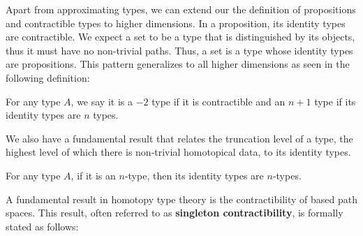 \documentclass[main.tex]{subfiles}
\begin{document}
Apart from approximating types, we can extend our the definition of propositions and contractible types to higher dimensions. In a proposition, its identity types are contractible. We expect a set to be a type that is distinguished by its objects, thus it must have no non-trivial paths. Thus, a set is a type whose identity types are propositions. This pattern generalizes to all higher dimensions as seen in the following definition: 

\begin{definition}
    For any type $A$, we say it is a $-2$ type if it is contractible and an $n+1$ type if its identity types are $n$ types.
\end{definition}

We also have a fundamental result that relates the truncation level of a type, the highest level of which there is non-trivial homotopical data, to its identity types.

\begin{lemma}
    \label{lem:ntypeidenntype}
    For any type $A$, if it is an $n$-type, then its identity types are $n$-types.
\end{lemma}

A fundamental result in homotopy type theory is the contractibility of based path spaces. This result, often referred to as \textbf{singleton contractibility}, is formally stated as follows:
\end{document}
